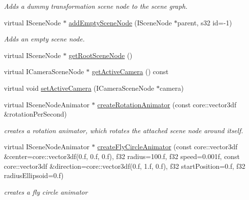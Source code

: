 \begin{DoxyCompactItemize}
\begin{DoxyCompactList}\small\item\em Adds a dummy transformation scene node to the scene graph. \end{DoxyCompactList}\item 
\hypertarget{classirr_1_1scene_1_1_c_scene_manager_a84356c50fa9bf92ff94c08b80431835a}{virtual I\-Scene\-Node $\ast$ \hyperlink{classirr_1_1scene_1_1_c_scene_manager_a84356c50fa9bf92ff94c08b80431835a}{add\-Empty\-Scene\-Node} (I\-Scene\-Node $\ast$parent, s32 id=-\/1)}\label{classirr_1_1scene_1_1_c_scene_manager_a84356c50fa9bf92ff94c08b80431835a}

\begin{DoxyCompactList}\small\item\em Adds an empty scene node. \end{DoxyCompactList}\item 
virtual I\-Scene\-Node $\ast$ \hyperlink{classirr_1_1scene_1_1_c_scene_manager_acb8872a7d44b695f0115afc518d1778d}{get\-Root\-Scene\-Node} ()
\item 
virtual I\-Camera\-Scene\-Node $\ast$ \hyperlink{classirr_1_1scene_1_1_c_scene_manager_a5b85191fa5bd908a1c2474bf440f49f1}{get\-Active\-Camera} () const 
\item 
virtual void \hyperlink{classirr_1_1scene_1_1_c_scene_manager_a8a28d4630075ef900d9cc0eb40ba9ba4}{set\-Active\-Camera} (I\-Camera\-Scene\-Node $\ast$camera)
\item 
virtual I\-Scene\-Node\-Animator $\ast$ \hyperlink{classirr_1_1scene_1_1_c_scene_manager_a4d8020dde9333353f6bc7b6b9eb77e94}{create\-Rotation\-Animator} (const core\-::vector3df \&rotation\-Per\-Second)
\begin{DoxyCompactList}\small\item\em creates a rotation animator, which rotates the attached scene node around itself. \end{DoxyCompactList}\item 
virtual I\-Scene\-Node\-Animator $\ast$ \hyperlink{classirr_1_1scene_1_1_c_scene_manager_a2d316866dc59dd0e29e185bc4e0f78fd}{create\-Fly\-Circle\-Animator} (const core\-::vector3df \&center=core\-::vector3df(0.f, 0.f, 0.f), f32 radius=100.f, f32 speed=0.\-001f, const core\-::vector3df \&direction=core\-::vector3df(0.\-f, 1.\-f, 0.\-f), f32 start\-Position=0.\-f, f32 radius\-Ellipsoid=0.\-f)
\begin{DoxyCompactList}\small\item\em creates a fly circle animator \end{DoxyCompactList}\item 

\end{DoxyCompactItemize}
